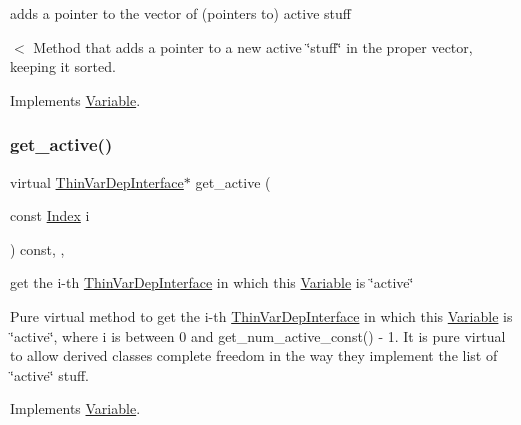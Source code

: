 adds a pointer to the vector of (pointers to) active stuff 

$<$ Method that adds a pointer to a new active \char`\"{}stuff\char`\"{} in the proper vector, keeping it sorted. 

Implements \mbox{\hyperlink{class_s_m_spp__di__unipi__it_1_1_variable_a0561f82eb0acc7697ef2da4375ca8030}{Variable}}.

\mbox{\label{class_s_m_spp__di__unipi__it_1_1_col_variable_a0a386ea1a060cc6aee2856da46a2df5c}} 
\subsubsection{\texorpdfstring{get\+\_\+active()}{get\_active()}}
{\footnotesize\ttfamily virtual \mbox{\hyperlink{class_s_m_spp__di__unipi__it_1_1_thin_var_dep_interface}{Thin\+Var\+Dep\+Interface}}$\ast$ get\+\_\+active (\begin{DoxyParamCaption}\item[{const \mbox{\hyperlink{class_s_m_spp__di__unipi__it_1_1_variable_ad53d6229d7ec28555a9c9c2fd9abf773}{Index}}}]{i }\end{DoxyParamCaption}) const\hspace{0.3cm}{\ttfamily [inline]}, {\ttfamily [override]}, {\ttfamily [virtual]}}



get the i-\/th \mbox{\hyperlink{class_s_m_spp__di__unipi__it_1_1_thin_var_dep_interface}{Thin\+Var\+Dep\+Interface}} in which this \mbox{\hyperlink{class_s_m_spp__di__unipi__it_1_1_variable}{Variable}} is \char`\"{}active\char`\"{} 

Pure virtual method to get the i-\/th \mbox{\hyperlink{class_s_m_spp__di__unipi__it_1_1_thin_var_dep_interface}{Thin\+Var\+Dep\+Interface}} in which this \mbox{\hyperlink{class_s_m_spp__di__unipi__it_1_1_variable}{Variable}} is \char`\"{}active\char`\"{}, where i is between 0 and get\+\_\+num\+\_\+active\+\_\+const() -\/ 1. It is pure virtual to allow derived classes complete freedom in the way they implement the list of \char`\"{}active\char`\"{} stuff. 

Implements \mbox{\hyperlink{class_s_m_spp__di__unipi__it_1_1_variable_a5debd2bbc900586b78fb5243edc700f4}{Variable}}.

